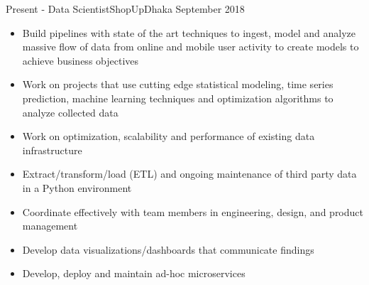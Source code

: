 %
%
%
\begin{experiences}
  \experience
    {Present - }   {Data Scientist}{ShopUp}{Dhaka}
    {September 2018} {
                      \begin{itemize}
                        \item Build pipelines with state of the art techniques to ingest, model and analyze massive flow of data from online and mobile user activity to create models to achieve business objectives
                        
                        \item Work on projects that use cutting edge statistical modeling, time series prediction, machine learning techniques and optimization algorithms to analyze collected data
                        
                        \item Work on optimization, scalability and performance of existing data infrastructure      
                        
                        \item Extract/transform/load (ETL) and ongoing maintenance of third party data in a Python environment
                        
                        \item Coordinate effectively with team members in engineering, design, and product management
                        
                        \item Develop data visualizations/dashboards that communicate findings
                        
                        \item Develop, deploy and maintain ad-hoc microservices\\
                                                                   

\end{itemize}}
\end{experiences}
